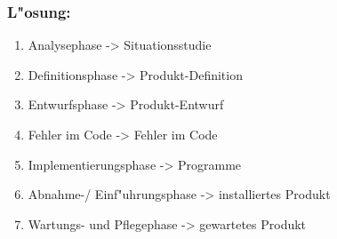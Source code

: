 \subsubsection*{L"osung:}
\begin{enumerate}
  \item Analysephase -> Situationsstudie
  \item Definitionsphase -> Produkt-Definition
  \item Entwurfsphase -> Produkt-Entwurf
  \item Fehler im Code -> Fehler im Code
  \item Implementierungsphase -> Programme
  \item Abnahme-/ Einf"uhrungsphase -> installiertes Produkt
  \item Wartungs- und Pflegephase -> gewartetes Produkt
\end{enumerate}










\clearpage
\setlength\bibitemsep{10pt}
\printbibliography[heading=bibintoc]
\newpage
\printglossary[type=main]
\printglossary[type=\acronymtype]




